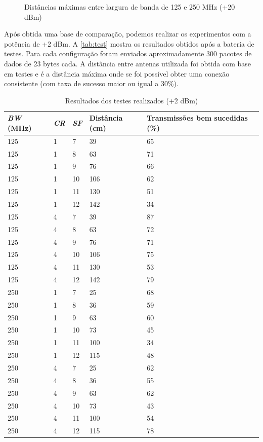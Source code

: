 \documentclass[
	12pt,				%
	openright,			%
	twoside,			%
	a4paper,			%
	english,			%
	french,				%
	spanish,			%
	brazil				%
	]{abntex2}
\begin{document}
\begin{figure}[H]
	\caption{\label{fig:Dist20}Distâncias máximas entre largura de banda de 125 e 250 MHz (+20 dBm)}
	\begin{center}
	    
	\end{center}
\end{figure}

Após obtida uma base de comparação, podemos realizar os experimentos com a potência de +2 dBm. A \autoref{tab:test} mostra os resultados obtidos após a bateria de testes. Para cada configuração foram enviados aproximadamente 300 pacotes de dados de 23 bytes cada. A distância entre antenas utilizada foi obtida com base em testes e é a distância máxima onde se foi possível obter uma conexão consistente (com taxa de sucesso maior ou igual a 30\%).

\newpage

\begin{table}[H]
\centering
\caption{Resultados dos testes realizados (+2 dBm)}
\label{tab:test}
\begin{tabular}{|l|l|l|l|l|}
\hline
\textit{BW} (MHz) & \textit{CR} & \textit{SF} & Distância (cm) & Transmissões bem sucedidas (\%) \\ \hline
125 & 1 & 7 & 39 & 65 \\
125 & 1 & 8 & 63 & 71 \\
125 & 1 & 9 & 76 & 66 \\
125 & 1 & 10 & 106 & 62 \\
125 & 1 & 11 & 130 & 51 \\
125 & 1 & 12 & 142 & 34 \\
125 & 4 & 7 & 39 & 87 \\
125 & 4 & 8 & 63 & 72 \\
125 & 4 & 9 & 76 & 71 \\
125 & 4 & 10 & 106 & 75 \\
125 & 4 & 11 & 130 & 53 \\
125 & 4 & 12 & 142 & 79 \\ \hline
250 & 1 & 7 & 25 & 68 \\
250 & 1 & 8 & 36 & 59 \\
250 & 1 & 9 & 63 & 60 \\
250 & 1 & 10 & 73 & 45 \\
250 & 1 & 11 & 100 & 34 \\
250 & 1 & 12 & 115 & 48 \\
250 & 4 & 7 & 25 & 62 \\
250 & 4 & 8 & 36 & 55 \\
250 & 4 & 9 & 63 & 62 \\
250 & 4 & 10 & 73 & 43 \\
250 & 4 & 11 & 100 & 54 \\
250 & 4 & 12 & 115 & 78 \\ \hline
\end{tabular}
\end{table}
\end{document}

